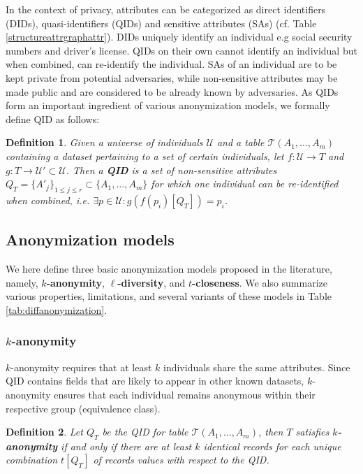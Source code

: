 \documentclass{bioinfo}
\newtheorem{definition}{Definition}
\begin{document}
In the context of privacy, attributes can be categorized as direct identifiers (DIDs), quasi-identifiers (QIDs) and sensitive attributes (SAs) (cf. Table \ref{structureattrgraphattr}). DIDs uniquely identify an individual e.g social security numbers and driver's license. QIDs on their own cannot identify an individual but when combined, can re-identify the individual. SAs of an individual are to be kept private from potential adversaries, while non-sensitive attributes may be made public and are considered to be already known by adversaries. As QIDs form an important ingredient of various anonymization models, we formally define QID as follows:

\begin{definition}
Given a universe of individuals $\mathcal{U}$ and a table $\mathcal{T}(A_1,\dots,A_m)$ containing a dataset pertaining to a set of certain individuals, let $f: \mathcal{U} \rightarrow T$ and $g: T \rightarrow \mathcal{U'} \subset \mathcal{U}$. Then a \textbf{QID} is a set of non-sensitive attributes $Q_T = \{A'_j\}_{1\leq j \leq r} \subset \{A_1,\dots,A_m\}$ for which one individual can be re-identified when combined, i.e. $\exists p \in \mathcal{U}:g(f(p_i)[Q_T]) = p_i$.
\end{definition}

\subsection{Anonymization models}
\label{sec:anonmethods}
We here define three basic anonymization models proposed in the literature, namely, \textbf{$k$-anonymity}, \textbf{$\ell$-diversity}, and \textbf{$t$-closeness}. We also summarize various properties, limitations, and several variants of these models in Table \ref{tab:diffanonymization}. 

\subsubsection{$k$-anonymity} 
$k$-anonymity requires that at least $k$ individuals share the same attributes. Since QID contains fields that are likely to appear in other known datasets, $k$-anonymity ensures that each individual remains anonymous within their respective group (equivalence class).

\begin{definition}
Let $Q_T$ be the QID for table $\mathcal{T}(A_1,\dots,A_m)$, then $T$ satisfies \textbf{$k$-anonymity} if and only if there are at least $k$ identical records for each unique combination $t[Q_T]$ of records values with respect to the QID.
\end{definition}
\end{document}
